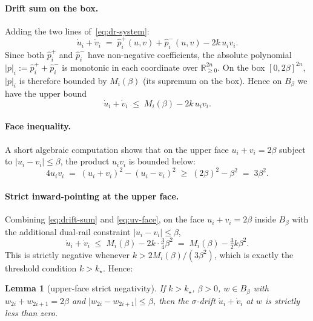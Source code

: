 \documentclass[11pt]{article}
\newtheorem{lemma}[theorem]{Lemma}
\newcommand{\R}{\mathbb{R}}
\newcommand{\absp}{\lvert p \rvert}
\newcommand{\abs}[1]{\lvert #1 \rvert}
\begin{document}
\paragraph{Drift sum on the box.}
Adding the two lines of~\eqref{eq:dr-system}:
\[
  \dot u_i + \dot v_i
    \;=\; \widehat{p}_i^{+}(u,v) + \widehat{p}_i^{-}(u,v)
          - 2 k\, u_i v_i.
\]
Since both $\widehat{p}_i^{+}$ and $\widehat{p}_i^{-}$ have
non-negative coefficients, the absolute polynomial
$\absp_i := \widehat{p}_i^{+} + \widehat{p}_i^{-}$ is monotonic in each
coordinate over $\R^{2n}_{\ge 0}$.  On the box $[0, 2\beta]^{2n}$,
$\absp_i$ is therefore bounded by $M_i(\beta)$ (its supremum on the
box).  Hence on $B_\beta$ we have the upper bound
\begin{equation}\label{eq:drift-sum}
  \dot u_i + \dot v_i
    \;\le\; M_i(\beta) - 2 k\, u_i v_i.
\end{equation}

\paragraph{Face inequality.}
A short algebraic computation shows that on the upper face $u_i + v_i =
2\beta$ subject to $\abs{u_i - v_i} \le \beta$, the product $u_i v_i$ is
bounded below:
\begin{equation}\label{eq:uv-face}
  4 u_i v_i \;=\; (u_i + v_i)^2 - (u_i - v_i)^2
              \;\ge\; (2\beta)^2 - \beta^2
              \;=\; 3\beta^2.
\end{equation}

\paragraph{Strict inward-pointing at the upper face.}
Combining \eqref{eq:drift-sum} and \eqref{eq:uv-face}, on the face
$u_i + v_i = 2\beta$ inside $B_\beta$ with the additional dual-rail
constraint $\abs{u_i - v_i} \le \beta$,
\[
  \dot u_i + \dot v_i
    \;\le\; M_i(\beta) - 2k \cdot \tfrac{3}{4}\beta^2
    \;=\; M_i(\beta) - \tfrac{3}{2}k\beta^2.
\]
This is strictly negative whenever
$k > 2 M_i(\beta) / (3 \beta^2)$, which is exactly the
threshold condition $k > k_\star$.  Hence:
\begin{lemma}[upper-face strict negativity]\label{lem:strict-neg}
If $k > k_\star$, $\beta > 0$, $w \in B_\beta$ with
$w_{2i} + w_{2i+1} = 2\beta$ and $\abs{w_{2i} - w_{2i+1}} \le \beta$,
then the $\sigma$-drift $\dot u_i + \dot v_i$ at $w$ is strictly less
than zero.
\end{lemma}
\end{document}
